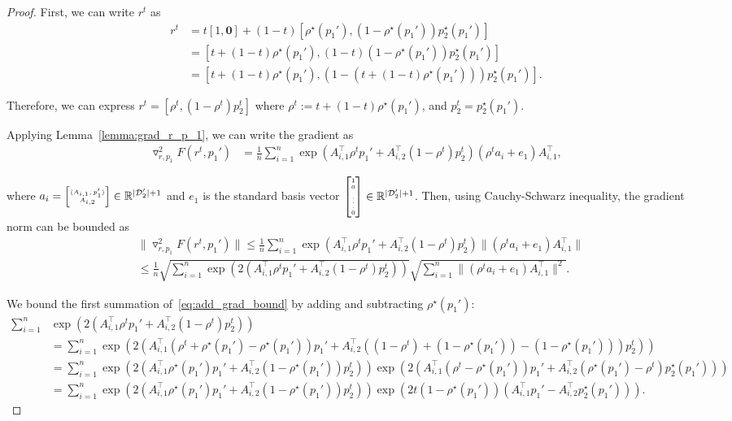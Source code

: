 \documentclass[table]{ai2style/ai2}
\newcommand{\D}[0]{\mathcal{D}}
\newcommand{\R}[0]{\mathbb{R}}
\newcommand\SmallMatrix[1]{{
\tiny\arraycolsep=0.3\arraycolsep\ensuremath{\begin{bmatrix}#1\end{bmatrix}}}}
\begin{document}
\begin{proof}

First, we can write $r^t$ as
\begin{align*}
    r^t &= t[1, \mathbf{0}] + (1 - t) [\rho^\star(p_1'), (1 - \rho^\star(p_1')) p_2^\star(p_1')] \\
    &= [t + (1 - t) \rho^\star(p_1'), (1 - t) (1 - \rho^\star(p_1')) p_2^\star(p_1')] \\
    &= [t + (1 - t) \rho^\star(p_1'), (1 - (t + (1 - t) \rho^\star(p_1'))) p_2^\star(p_1')].
\end{align*}

Therefore, we can express $r^t = [\rho^t, (1 - \rho^t) p_2^t]$ where $\rho^t := t + (1 - t) \rho^\star(p_1')$, and $p_2^t = p_2^\star(p_1')$. 

Applying Lemma~\ref{lemma:grad_r_p_1}, we can write the gradient as
\begin{align*}
    \triangledown^2_{r,p_1} F(r^t,p_1') &= \frac{1}{n}\sum_{i = 1}^n \exp(A_{i, 1}^\top \rho^t p_1' + A_{i, 2}^\top (1 - \rho^t) p_2^t) (\rho^t a_i + e_1) A_{i, 1}^\top,
\end{align*}

where $a_i = \SmallMatrix{\langle A_{i, 1}, p_1' \rangle \\ A_{i, 2}}  \in \R^{|\D_2'| + 1}$ and $e_1$ is the standard basis vector $\SmallMatrix{1 \\ 0 \\ \vdots \\ 0} \in \R^{|\D_2'| + 1}$. Then, using Cauchy-Schwarz inequality, the gradient norm can be bounded as
\begin{align}
&\|\triangledown^2_{r,p_1}F(r^t,p_1')\| \le \frac{1}{n}\sum_{i = 1}^n \exp(A_{i, 1}^\top \rho^t p_1' + A_{i, 2}^\top (1 - \rho^t) p_2^t) \|(\rho^t a_i + e_1) A_{i, 1}^\top\| \label{eq:add_grad_bound} \\
&\le \frac{1}{n}\sqrt{\sum_{i = 1}^n \exp(2(A_{i, 1}^\top \rho^t p_1' + A_{i, 2}^\top (1 - \rho^t) p_2^t))} \sqrt{\sum_{i = 1}^n \|(\rho^t a_i + e_1) A_{i, 1}^\top\|^2}. \nonumber 
\end{align}

We bound the first summation of~\eqref{eq:add_grad_bound} by adding and subtracting $\rho^\star(p_1')$:
\begin{align*}
\sum_{i = 1}^n &\exp(2(A_{i, 1}^\top \rho^t p_1' + A_{i, 2}^\top (1 - \rho^t) p_2^t)) \\
&= \sum_{i = 1}^n \exp(2(A_{i, 1}^\top (\rho^t + \rho^\star(p_1') - \rho^\star(p_1')) p_1' + A_{i, 2}^\top ((1 - \rho^t) + (1 - \rho^\star(p_1')) - (1 - \rho^\star(p_1'))) p_2^t)) \\
&= \sum_{i = 1}^n \exp(2(A_{i, 1}^\top \rho^\star(p_1') p_1' + A_{i, 2}^\top (1 - \rho^\star(p_1')) p_2^t)) \exp(2(A_{i, 1}^\top (\rho^t - \rho^\star(p_1')) p_1' + A_{i,2}^\top (\rho^\star(p_1') - \rho^t) p_2^\star(p_1') )) \\
&= \sum_{i = 1}^n \exp(2(A_{i, 1}^\top \rho^\star(p_1') p_1' + A_{i, 2}^\top (1 - \rho^\star(p_1')) p_2^t)) \exp(2t (1 - \rho^\star(p_1'))(A_{i, 1}^\top p_1' - A_{i, 2}^\top p_2^\star(p_1'))).
\end{align*}


\end{proof}
\end{document}
